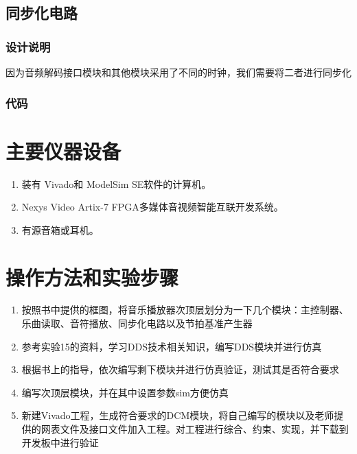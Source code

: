 \documentclass{../source/zjureport}
\begin{document}
    \subsection{同步化电路}
        \subsubsection{设计说明}
        因为音频解码接口模块和其他模块采用了不同的时钟，我们需要将二者进行同步化
        \subsubsection{代码}
        

\section{主要仪器设备}
\begin{enumerate}
    \item 装有 Vivado和 ModelSim SE软件的计算机。
    \item Nexys Video Artix-7 FPGA多媒体音视频智能互联开发系统。
    \item 有源音箱或耳机。
\end{enumerate}

\section{操作方法和实验步骤}
\begin{enumerate}
    \item 按照书中提供的框图，将音乐播放器次顶层划分为一下几个模块：主控制器、乐曲读取、音符播放、同步化电路以及节拍基准产生器
    \item 参考实验15的资料，学习DDS技术相关知识，编写DDS模块并进行仿真
    \item 根据书上的指导，依次编写剩下模块并进行仿真验证，测试其是否符合要求
    \item 编写次顶层模块，并在其中设置参数sim方便仿真
    \item 新建Vivado工程，生成符合要求的DCM模块，将自己编写的模块以及老师提供的网表文件及接口文件加入工程。对工程进行综合、约束、实现，并下载到开发板中进行验证
\end{enumerate}
\end{document}
